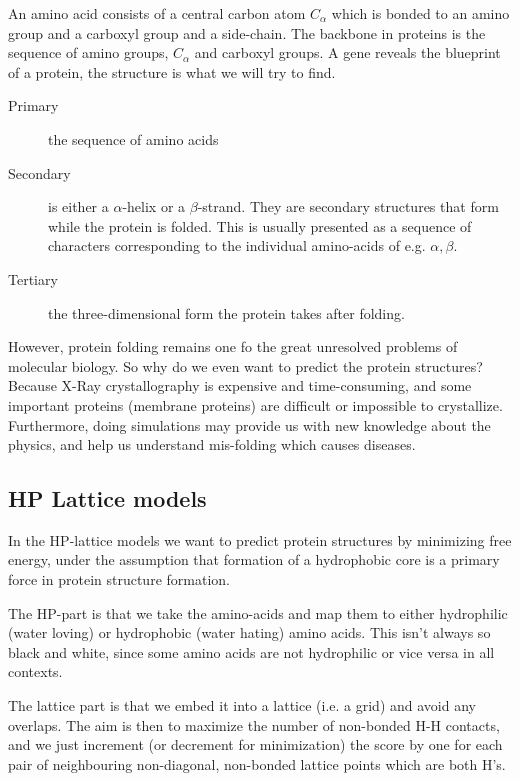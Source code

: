     An amino acid consists of a central carbon atom $C_\alpha$ which is bonded 
    to an amino group and a carboxyl group and a side-chain. The backbone in 
    proteins is the sequence of amino groups, $C_\alpha$ and carboxyl groups. A 
    gene reveals the blueprint of a protein, the structure is what we will try 
    to find.
    
    \begin{description}
        \item[Primary] the sequence of amino acids
        \item[Secondary] is either a $\alpha$-helix or a $\beta$-strand. They 
        are secondary structures that form while the protein is folded. This is 
        usually presented as a sequence of characters corresponding to the 
        individual amino-acids of e.g. $\alpha,\beta$.
        \item[Tertiary] the three-dimensional form the protein takes after 
        folding.
    \end{description}

    However, protein folding remains one fo the great unresolved problems of 
    molecular biology. So why do we even want to predict the protein 
    structures? Because X-Ray crystallography is expensive and time-consuming, 
    and some important proteins (membrane proteins) are difficult or impossible 
    to crystallize. Furthermore, doing simulations may provide us with new 
    knowledge about the physics, and help us understand mis-folding which 
    causes diseases.
    
    \subsection{HP Lattice models}
    In the HP-lattice models we want to predict protein structures by 
    minimizing free energy, under the assumption that formation of a 
    hydrophobic core is a primary force in protein structure formation.
    
    The HP-part is that we take the amino-acids and map them to either 
    hydrophilic (water loving) or hydrophobic (water hating) amino acids. This 
    isn't always so black and white, since some amino acids are not hydrophilic 
    or vice versa in all contexts.
    
    The lattice part is that we embed it into a lattice (i.e. a grid) and avoid 
    any overlaps. The aim is then to maximize the number of non-bonded H-H 
    contacts, and we just increment (or decrement for minimization) the score 
    by one for each pair of neighbouring non-diagonal, non-bonded lattice 
    points which are both H's.
    
